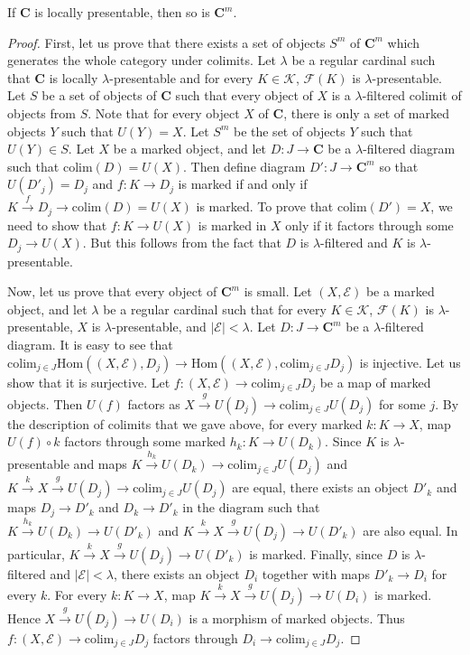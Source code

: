 \documentclass[reqno]{amsart}
\theoremstyle{definition}
\theoremstyle{remark}
\newcommand{\cat}[1]{\mathbf{#1}}
\newcommand{\C}{\cat{C}}
\newcommand{\Hom}{\mathrm{Hom}}
\newcommand{\colim}{\mathrm{colim}}
\numberwithin{figure}{section}
\begin{document}
\begin{prop}
If $\C$ is locally presentable, then so is $\C^m$.
\end{prop}
\begin{proof}
First, let us prove that there exists a set of objects $S^m$ of $\C^m$ which generates the whole category under colimits.
Let $\lambda$ be a regular cardinal such that $\C$ is locally $\lambda$-presentable and for every $K \in \mathcal{K}$, $\mathcal{F}(K)$ is $\lambda$-presentable.
Let $S$ be a set of objects of $\C$ such that every object of $X$ is a $\lambda$-filtered colimit of objects from $S$.
Note that for every object $X$ of $\C$, there is only a set of marked objects $Y$ such that $U(Y) = X$.
Let $S^m$ be the set of objects $Y$ such that $U(Y) \in S$.
Let $X$ be a marked object, and let $D : J \to \C$ be a $\lambda$-filtered diagram such that $\colim(D) = U(X)$.
Then define diagram $D' : J \to \C^m$ so that $U(D'_j) = D_j$ and $f : K \to D_j$ is marked if and only if $K \xrightarrow{f} D_j \to \colim(D) = U(X)$ is marked.
To prove that $\colim(D') = X$, we need to show that $f : K \to U(X)$ is marked in $X$ only if it factors through some $D_j \to U(X)$.
But this follows from the fact that $D$ is $\lambda$-filtered and $K$ is $\lambda$-presentable.

Now, let us prove that every object of $\C^m$ is small.
Let $(X,\mathcal{E})$ be a marked object, and let $\lambda$ be a regular cardinal such that
for every $K \in \mathcal{K}$, $\mathcal{F}(K)$ is $\lambda$-presentable, $X$ is $\lambda$-presentable, and $|\mathcal{E}| < \lambda$.
Let $D : J \to \C^m$ be a $\lambda$-filtered diagram.
It is easy to see that $\colim_{j \in J} \Hom((X,\mathcal{E}), D_j) \to \Hom((X,\mathcal{E}), \colim_{j \in J} D_j)$ is injective.
Let us show that it is surjective.
Let $f : (X,\mathcal{E}) \to \colim_{j \in J} D_j$ be a map of marked objects.
Then $U(f)$ factors as $X \xrightarrow{g} U(D_j) \to \colim_{j \in J} U(D_j)$ for some $j$.
By the description of colimits that we gave above, for every marked $k : K \to X$, map $U(f) \circ k$ factors through some marked $h_k : K \to U(D_k)$.
Since $K$ is $\lambda$-presentable and maps $K \xrightarrow{h_k} U(D_k) \to \colim_{j \in J} U(D_j)$
and $K \xrightarrow{k} X \xrightarrow{g} U(D_j) \to \colim_{j \in J} U(D_j)$ are equal,
there exists an object $D'_k$ and maps $D_j \to D'_k$ and $D_k \to D'_k$ in the diagram such that
$K \xrightarrow{h_k} U(D_k) \to U(D'_k)$ and $K \xrightarrow{k} X \xrightarrow{g} U(D_j) \to U(D'_k)$ are also equal.
In particular, $K \xrightarrow{k} X \xrightarrow{g} U(D_j) \to U(D'_k)$ is marked.
Finally, since $D$ is $\lambda$-filtered and $|\mathcal{E}| < \lambda$, there exists an object $D_i$ together with maps $D'_k \to D_i$ for every $k$.
For every $k : K \to X$, map $K \xrightarrow{k} X \xrightarrow{g} U(D_j) \to U(D_i)$ is marked.
Hence $X \xrightarrow{g} U(D_j) \to U(D_i)$ is a morphism of marked objects.
Thus $f : (X,\mathcal{E}) \to \colim_{j \in J} D_j$ factors through $D_i \to \colim_{j \in J} D_j$.
\end{proof}
\end{document}
